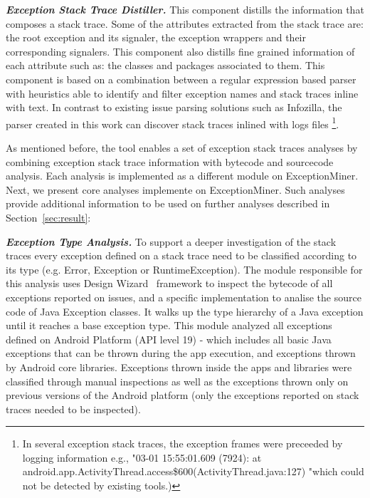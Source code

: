 \documentclass[conference]{IEEEtran}
\begin{document}
\emph{\textbf{Exception Stack Trace Distiller.}}
This component distills the information that composes a stack trace.
 Some of the attributes extracted from the stack trace are:
 the root exception and its signaler, the exception wrappers and their corresponding signalers. 
This component also distills fine grained information of each attribute such as: the classes and packages associated to them.
This component is based on a combination between a regular expression based parser 
with heuristics able to identify and filter exception names and stack traces inline with text. 
In contrast to existing issue parsing solutions such as Infozilla, the parser
created in this work can discover stack traces inlined with logs files \footnote{In several 
exception stack traces, the exception frames were preceeded by logging information e.g., 
"03-01 15:55:01.609 (7924): at android.app.ActivityThread.access\$600(ActivityThread.java:127) 
"which could not be detected by existing tools.)}.



As mentioned before, the tool enables a set of exception stack traces analyses by combining exception stack 
trace information with bytecode and sourcecode analysis. Each analysis is implemented as a different module 
on ExceptionMiner. Next, we present core analyses implemente on ExceptionMiner. Such analyses 
provide additional information to be used on further analyses described in Section~\ref{sec:result}:

\emph{\textbf{Exception Type Analysis.}} To support a deeper investigation of the 
stack traces every exception defined on a stack trace need to be classified according to its type
(e.g. Error, Exception or RuntimeException). The module responsible for this analysis 
uses Design Wizard~\cite{Brunet09} framework to inspect the bytecode of all exceptions reported on issues,
and a specific implementation to analise the source code of Java Exception classes.
It walks up the type hierarchy of a Java exception until it reaches a base exception type.
This module analyzed all exceptions defined on Android Platform (API level 19) - 
which includes all basic Java exceptions that can be thrown during the app execution,
and exceptions thrown by Android core libraries. 
Exceptions thrown inside the apps and libraries were classified through manual inspections 
as well as the exceptions thrown only on previous versions of the Android platform
(only the exceptions reported on stack traces needed to be inspected).
\end{document}
